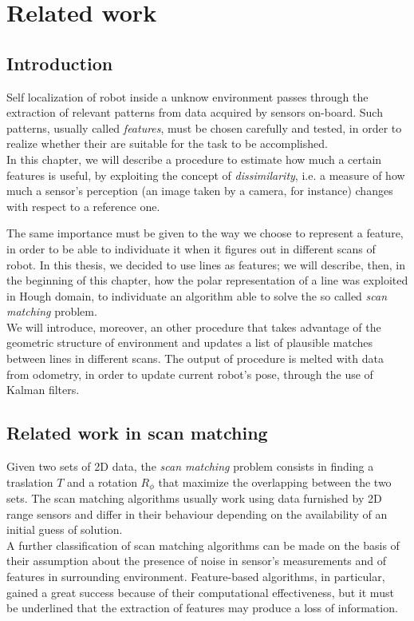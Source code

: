 \documentclass[a4paper, onecolumn]{report}
\begin{document}
\large
\sloppy

\tableofcontents
\newpage

\chapter{Related work}
\section{Introduction}
Self localization of robot inside a unknow environment passes through the extraction of relevant patterns from data acquired by sensors on-board. Such patterns, usually called \emph{features}, must be chosen carefully and tested, in order to realize whether their are suitable for the task to be accomplished. \\
In this chapter, we will describe a procedure to estimate how much a certain features is useful, by exploiting the concept of \emph{dissimilarity}, i.e. a measure of how much a sensor's perception (an image taken by a camera, for instance) changes with respect to a reference one.

The same importance must be given to the way we choose to represent a feature, in order to be able to individuate it when it figures out in different scans of robot. In this thesis, we decided to use lines as features; we will describe, then, in the beginning of this chapter, how the polar representation of a line was exploited in Hough domain, to individuate an algorithm able to solve the so called \emph{scan matching} problem. \\ 
We will introduce, moreover, an other procedure that takes advantage of the geometric structure of environment and updates a list of plausible matches between lines in different scans. The output of procedure is melted with data from odometry, in order to update current robot's pose, through the use of Kalman filters.

\section{Related work in scan matching}
Given two sets of 2D data, the \emph{scan matching} problem consists in finding a traslation $T$ and a rotation $R_\phi$ that maximize the overlapping between the two sets. The scan matching algorithms usually work using data furnished by 2D range sensors and differ in their behaviour depending on the availability of an initial guess of solution. \\
A further classification of scan matching algorithms can be made on the basis of their assumption about the presence of noise in sensor's measurements and of features in surrounding environment. Feature-based algorithms, in particular, gained a great success because of their computational effectiveness, but it must be underlined that the extraction of features may produce a loss of information. 
\end{document}
